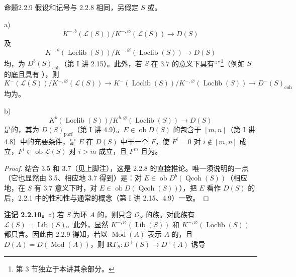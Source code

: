 \begin{SGAresult}{命题}{2.2.9}
假设和记号与 2.2.8 相同，另假定 $S$ 或。

a) 
\[
K^{-,b}(\mathcal L(S))/K^{-,\varnothing}(\mathcal L(S))\longrightarrow D(S)
\]
及
\[
K^{-,b}(\operatorname{Loclib}(S))/K^{-,\varnothing}(\operatorname{Loclib}(S))\longrightarrow D(S)
\]
均，为 $D^b(S)_{\mathrm{coh}}$（第 I 讲 2.15）。此外，若 $S$ 在 3.7 的意义下具有“”\footnote{第 3 节独立于本讲其余部分。}（例如 $S$ 的底且具有 ），则
\[
K^-(\mathcal L(S))/K^{-,\varnothing}(\mathcal L(S))\longrightarrow
K^-(\operatorname{Loclib}(S))/K^{-,\varnothing}(\operatorname{Loclib}(S))\longrightarrow D^-(S)_{\mathrm{coh}}
\]
均为。

b) 
\[
K^b(\operatorname{Loclib}(S))/K^{b,\varnothing}(\operatorname{Loclib}(S))\longrightarrow D(S)
\]
是的，其为 $D(S)_{\mathrm{parf}}$（第 I 讲 4.9）。$E\in\operatorname{ob}D(S)$ 的包含于 $[m,n]$（第 I 讲 4.8）中的充要条件，是 $E$ 在 $D(S)$ 中于一个 $F$，使 $F^i=0$ 对 $i\notin[m,n]$ 成立，$F^i\in\operatorname{ob}\mathcal L(S)$ 对 $i>m$ 成立，且 $F^m$ 且为。
\end{SGAresult}
\begin{proof}
结合 3.5 和 3.7（见上脚注），这是 2.2.8 的直接推论。唯一须说明的一点（它也显然由 3.5、相应地 3.7 得到）是：对 $E\in\operatorname{ob}D^b(\operatorname{Qcoh}(S))$（相应地，在 $S$ 有 3.7 意义下时，对 $E\in\operatorname{ob}D(\operatorname{Qcoh}(S))$），把 $E$ 看作 $D(S)$ 的后，2.2.1 中的性和性与通常的概念（第 I 讲 2.15、4.9）一致。
\end{proof}
\textbf{注记 2.2.10。}a) 若 $S$ 为环 $A$ 的，则只含 $\mathcal O_S$ 的族。对此族有 $\mathcal L(S)=\operatorname{Lib}(S)$。此外，显然 $K^{-,\varnothing}(\operatorname{Lib}(S))$ 和 $K^{-,\varnothing}(\operatorname{Loclib}(S))$ 都只含。因此由 2.2.9 得知，若以 $\operatorname{Mod}(A)$ 表示 $A$-的，且 $D(A)=D(\operatorname{Mod}(A))$，则 $\mathbf R\Gamma_S:D^+(S)\to D^+(A)$ 诱导
